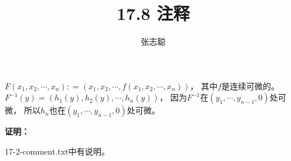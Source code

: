 \documentclass{article}
\begin{document}
\title{17.8 注释}
\author{张志聪}
\maketitle

\begin{zremark}
  $F(x_1, x_2, \cdots, x_n) : = (x_1, x_2, \cdots, f(x_1, x_2, \cdots, x_n))$，
  其中$f$是连续可微的。
  $F^{-1}(y) = (h_1(y), h_2(y), \cdots, h_n(y))$，
  因为$F^{-1}$在$(y_1,\cdots,y_{n - 1}, 0)$处可微，
  所以$h_n$也在$(y_1,\cdots,y_{n - 1}, 0)$处可微。
\end{zremark}

\textbf{证明：}

17-2-comment.txt中有说明。
\end{document}
